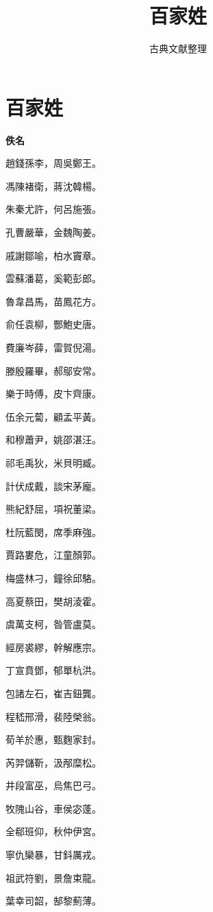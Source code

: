 \documentclass[12pt,a4paper]{ctexbook}
\title{百家姓}
\author{古典文献整理}
\date{}
\begin{document}
\maketitle
\tableofcontents
\newpage
\section{百家姓}
\textbf{佚名}\par\vspace{0.5em}
趙錢孫李，周吳鄭王。\par
馮陳褚衛，蔣沈韓楊。\par
朱秦尤許，何呂施張。\par
孔曹嚴華，金魏陶姜。\par
戚謝鄒喻，柏水竇章。\par
雲蘇潘葛，奚範彭郎。\par
魯韋昌馬，苗鳳花方。\par
俞任袁柳，酆鮑史唐。\par
費廉岑薛，雷賀倪湯。\par
滕殷羅畢，郝鄔安常。\par
樂于時傅，皮卞齊康。\par
伍余元蔔，顧孟平黃。\par
和穆蕭尹，姚邵湛汪。\par
祁毛禹狄，米貝明臧。\par
計伏成戴，談宋茅龐。\par
熊紀舒屈，項祝董梁。\par
杜阮藍閔，席季麻強。\par
賈路婁危，江童顏郭。\par
梅盛林刁，鐘徐邱駱。\par
高夏蔡田，樊胡淩霍。\par
虞萬支柯，昝管盧莫。\par
經房裘繆，幹解應宗。\par
丁宣賁鄧，郁單杭洪。\par
包諸左石，崔吉鈕龔。\par
程嵇邢滑，裴陸榮翁。\par
荀羊於惠，甄麴家封。\par
芮羿儲靳，汲邴糜松。\par
井段富巫，烏焦巴弓。\par
牧隗山谷，車侯宓蓬。\par
全郗班仰，秋仲伊宮。\par
寧仇欒暴，甘鈄厲戎。\par
祖武符劉，景詹束龍。\par
葉幸司韶，郜黎薊薄。\par
\end{document}
